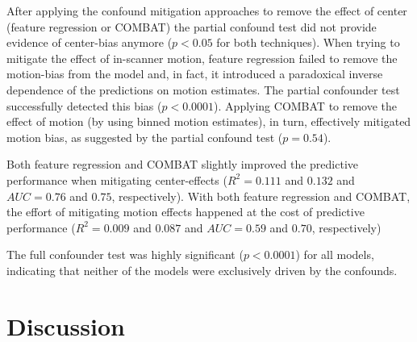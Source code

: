 \documentclass{article}
\begin{document}
After applying the confound mitigation approaches to remove the effect of center (feature regression or COMBAT) the partial confound test did not provide evidence of center-bias anymore ($p < 0.05$ for both techniques). When trying to mitigate the effect of in-scanner motion, feature regression failed to remove the motion-bias from the model and, in fact, it introduced a paradoxical inverse dependence of the predictions on motion estimates. The partial confounder test successfully detected this bias ($p<0.0001$). Applying COMBAT to remove the effect of motion (by using binned motion estimates), in turn, effectively mitigated motion bias, as suggested by the partial confound test ($p=0.54$).

Both feature regression and COMBAT slightly improved the predictive performance when mitigating center-effects ($R^2=0.111$ and $0.132$ and $AUC=0.76$ and $0.75$, respectively). With both feature regression and COMBAT, the effort of mitigating motion effects happened at the cost of predictive performance ($R^2=0.009$ and $0.087$ and $AUC=0.59$ and $0.70$, respectively)

The full confounder test was highly significant ($p<0.0001$) for all models, indicating that neither of the models were exclusively driven by the confounds.

\section{Discussion}
\end{document}
